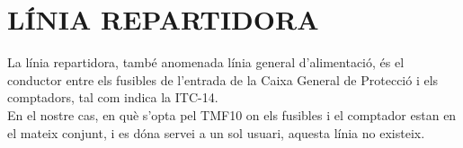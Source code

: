 \chapter{\uppercase{Línia repartidora}}
La línia repartidora, també anomenada línia general d'alimentació, és el conductor entre els fusibles de l'entrada de la Caixa General de Protecció i els comptadors, tal com indica la ITC-14.\\
\newline En el nostre cas, en què s'opta pel TMF10 on els fusibles i el comptador estan en el mateix conjunt, i es dóna servei a un sol usuari, aquesta línia no existeix.
\clearpage